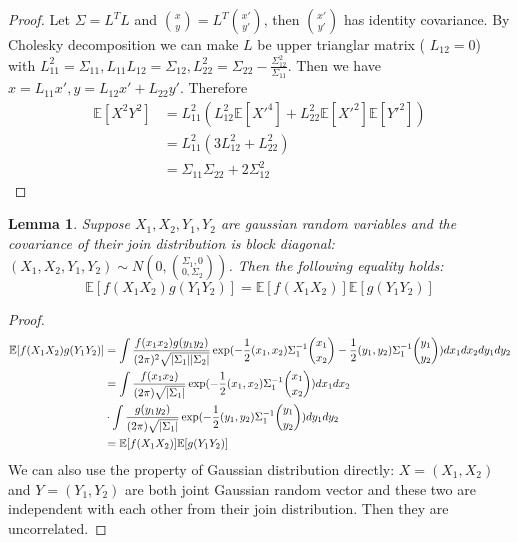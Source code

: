 \documentclass{article}
\DeclarePairedDelimiter\abs{\lvert}{\rvert}
\def\E{\mathbb{E}}
\newtheorem{lemma}{Lemma}
\begin{document}
\begin{proof}
Let $\Sigma = L^T L $ and $\binom{x}{y} = L^T \binom{x'}{y'}$, then $\binom{x'}{y'}$ has identity covariance. By Cholesky decomposition we can make $L$ be upper trianglar matrix (
$L_{12}=0$) with $L_{11}^2 = \Sigma_{11}, L_{11}L_{12} = \Sigma_{12}, L_{22}^2 = \Sigma_{22} - \frac{\Sigma_{12}^2}{\Sigma_{11}}$. Then we have $x = L_{11} x', y = L_{12} x' + L_{22} y'$. Therefore
\begin{align*}
\E[X^2 Y^2] & = L_{11}^2 (L_{12}^2\E[X'^4]+ L^2_{22}\E[X'^2]\E[Y'^2]) \\
& = L_{11}^2(3L_{12}^2 + L^2_{22}) \\
& = \Sigma_{11}\Sigma_{22} + 2\Sigma_{12}^2
\end{align*}
\end{proof}
\begin{lemma}\label{lem:abcd}
Suppose $X_1, X_2, Y_1, Y_2$ are gaussian random variables and the covariance of their join distribution is block diagonal:
$(X_1, X_2, Y_1, Y_2) \sim N(0, \binom{\Sigma_1, 0}{0, \Sigma_2})$. Then the following equality holds:
\begin{equation}
\E[f(X_1X_2)g(Y_1Y_2)] = \E[f(X_1 X_2)] \E[g(Y_1 Y_2)]
\end{equation}
\end{lemma}
\begin{proof}
\begin{align*}
\E[f(X_1X_2)g(Y_1Y_2)] & = \int \frac{f(x_1 x_2) g(y_1 y_2) }{(2\pi)^2 \sqrt{\abs{\Sigma_1}\abs{\Sigma_2}}}\exp(-\frac{1}{2}(x_1, x_2) \Sigma_1^{-1} \binom{x_1}{x_2}-\frac{1}{2}(y_1, y_2) \Sigma_1^{-1} \binom{y_1}{y_2})dx_1 d x_2 dy_1 dy_2 \\
& = \int \frac{f(x_1 x_2)  }{(2\pi) \sqrt{\abs{\Sigma_1}}}\exp(-\frac{1}{2}(x_1, x_2) \Sigma_1^{-1} \binom{x_1}{x_2})dx_1 d x_2  \\
&\cdot  \int \frac{ g(y_1 y_2)  }{(2\pi) \sqrt{\abs{\Sigma_1}}}\exp(-\frac{1}{2}(y_1, y_2) \Sigma_1^{-1} \binom{y_1}{y_2})dy_1 d y_2 \\
& = \E[f(X_1 X_2)] \E[g(Y_1 Y_2)]
\end{align*}
We can also use the property of Gaussian distribution directly: $X=(X_1, X_2)$ and $Y=(Y_1, Y_2)$ are both joint Gaussian random vector and these two are independent with each other from their join distribution. Then they are uncorrelated.
\end{proof}
\end{document}
